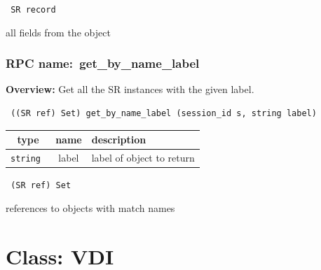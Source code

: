 \vspace{0.3cm}

{\tt 
SR record
}


all fields from the object
\vspace{0.3cm}
\vspace{0.3cm}
\vspace{0.3cm}
\subsubsection{RPC name:~get\_by\_name\_label}

{\bf Overview:} 
Get all the SR instances with the given label.

\begin{verbatim} ((SR ref) Set) get_by_name_label (session_id s, string label)\end{verbatim}



 
\vspace{0.3cm}
\begin{tabular}{|c|c|p{7cm}|}
 \hline
{\bf type} & {\bf name} & {\bf description} \\ \hline
{\tt string } & label & label of object to return \\ \hline 

\end{tabular}

\vspace{0.3cm}

{\tt 
(SR ref) Set
}


references to objects with match names
\vspace{0.3cm}
\vspace{0.3cm}
\vspace{0.3cm}

\vspace{1cm}
\newpage
\section{Class: VDI}
